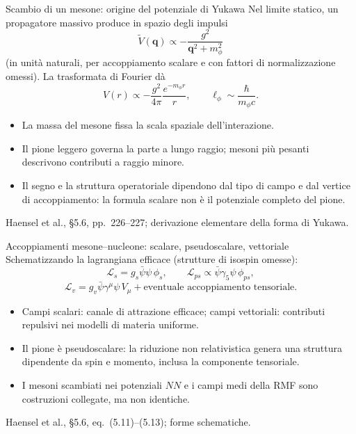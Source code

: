 \begin{frame}[t]{Scambio di un mesone: origine del potenziale di Yukawa}
\small
Nel limite statico, un propagatore massivo produce in spazio degli impulsi
\[
\widetilde V(\mathbf q)\propto-\frac{g^2}{\mathbf q^2+m_\phi^2}
\]
(in unità naturali, per accoppiamento scalare e con fattori di normalizzazione omessi).
La trasformata di Fourier dà
\[
V(r)\propto-\frac{g^2}{4\pi}\frac{e^{-m_\phi r}}{r},
\qquad \ell_\phi\sim\frac{\hbar}{m_\phi c}.
\]
\begin{itemize}
\item La massa del mesone fissa la scala spaziale dell'interazione.
\item Il pione leggero governa la parte a lungo raggio; mesoni più pesanti descrivono contributi a raggio minore.
\item Il segno e la struttura operatoriale dipendono dal tipo di campo e dal vertice di accoppiamento: la formula scalare non è il potenziale completo del pione.
\end{itemize}
{\footnotesize Haensel et al., §5.6, pp.~226--227; derivazione elementare della forma di Yukawa.}
\end{frame}

\begin{frame}[t]{Accoppiamenti mesone--nucleone: scalare, pseudoscalare, vettoriale}
\small
Schematizzando la lagrangiana efficace (strutture di isospin omesse):
\[
\mathcal L_s=g_s\bar\psi\psi\,\phi_s,\qquad
\mathcal L_{ps}\propto\bar\psi\gamma_5\psi\,\phi_{ps},
\]
\[
\mathcal L_v=g_v\bar\psi\gamma^\mu\psi\,V_\mu
+\text{eventuale accoppiamento tensoriale}.
\]
\begin{itemize}
\item Campi scalari: canale di attrazione efficace; campi vettoriali: contributi repulsivi nei modelli di materia uniforme.
\item Il pione è pseudoscalare: la riduzione non relativistica genera una struttura dipendente da spin e momento, inclusa la componente tensoriale.
\item I mesoni scambiati nei potenziali $NN$ e i campi medi della RMF sono costruzioni collegate, ma non identiche.
\end{itemize}
{\footnotesize Haensel et al., §5.6, eq.~(5.11)--(5.13); forme schematiche.}
\end{frame}

